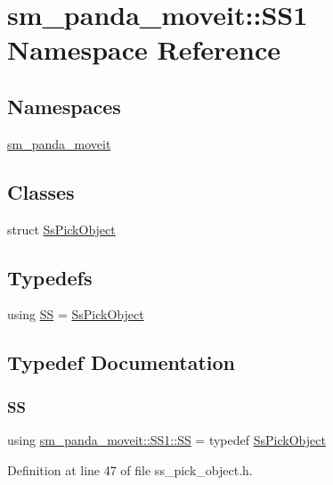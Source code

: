 \hypertarget{namespacesm__panda__moveit_1_1SS1}{}\section{sm\+\_\+panda\+\_\+moveit\+:\+:S\+S1 Namespace Reference}
\label{namespacesm__panda__moveit_1_1SS1}
\subsection*{Namespaces}
\begin{DoxyCompactItemize}
\item 
 \hyperlink{namespacesm__panda__moveit_1_1SS1_1_1sm__panda__moveit}{sm\+\_\+panda\+\_\+moveit}
\end{DoxyCompactItemize}
\subsection*{Classes}
\begin{DoxyCompactItemize}
\item 
struct \hyperlink{structsm__panda__moveit_1_1SS1_1_1SsPickObject}{Ss\+Pick\+Object}
\end{DoxyCompactItemize}
\subsection*{Typedefs}
\begin{DoxyCompactItemize}
\item 
using \hyperlink{namespacesm__panda__moveit_1_1SS1_a6a86a1b3d38fb54e2dda0eed53a68694}{SS} = \hyperlink{structsm__panda__moveit_1_1SS1_1_1SsPickObject}{Ss\+Pick\+Object}
\end{DoxyCompactItemize}


\subsection{Typedef Documentation}
\mbox{\label{namespacesm__panda__moveit_1_1SS1_a6a86a1b3d38fb54e2dda0eed53a68694}} 
\subsubsection{\texorpdfstring{SS}{SS}}
{\footnotesize\ttfamily using \hyperlink{namespacesm__panda__moveit_1_1SS1_a6a86a1b3d38fb54e2dda0eed53a68694}{sm\+\_\+panda\+\_\+moveit\+::\+S\+S1\+::\+SS} = typedef \hyperlink{structsm__panda__moveit_1_1SS1_1_1SsPickObject}{Ss\+Pick\+Object}}



Definition at line 47 of file ss\+\_\+pick\+\_\+object.\+h.

